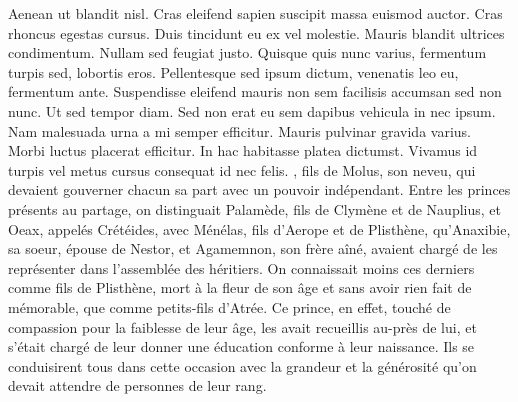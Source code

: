 \documentclass{article}
\begin{document}
{{Aenean ut blandit nisl. Cras eleifend sapien suscipit massa euismod auctor. Cras rhoncus egestas cursus. Duis tincidunt eu ex vel molestie. Mauris blandit ultrices condimentum. Nullam sed feugiat justo. Quisque quis nunc varius, fermentum turpis sed, lobortis eros. Pellentesque sed ipsum dictum, venenatis leo eu, fermentum ante. Suspendisse eleifend mauris non sem facilisis accumsan sed non nunc. Ut sed tempor diam. Sed non erat eu sem dapibus vehicula in nec ipsum. Nam malesuada urna a mi semper efficitur. Mauris pulvinar gravida varius. Morbi luctus placerat efficitur. In hac habitasse platea dictumst. Vivamus id turpis vel metus cursus consequat id nec felis.
}}, fils de Molus, son neveu, qui devaient gouverner chacun sa part avec un pouvoir indépendant. Entre les princes présents au partage, on distinguait Palamède, fils de Clymène et de Nauplius, et Oeax, appelés Crétéides, avec Ménélas, fils d'Ae\-ro\-pe et de Plisthène, qu'Anaxibie, sa soeur, épouse de Nestor, et Agamemnon, son frère aîné, avaient chargé de les représenter dans l'assemblée des héritiers. On connaissait moins ces derniers comme fils de Plisthène, mort à la fleur de son âge et sans avoir rien fait de mémorable, que comme petits-fils d'Atrée. Ce prince, en effet, touché de compassion pour la faiblesse de leur âge, les avait recueillis au-près de lui, et s'était chargé de leur donner une éducation conforme à leur naissance. Ils se conduisirent tous dans cette occasion avec la grandeur et la générosité qu'on devait attendre de personnes de leur rang.
 \pend
 \pstart
\end{document}
